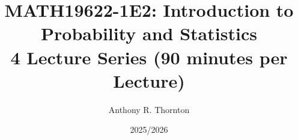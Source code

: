 


\newcommand{\insertcode}[2]{%
  \only<presentation>{%
    \setbeamercolor{block title}{bg=SolarizedAccent, fg=black}
    \setbeamercolor{block body}{bg=SolarizedYellow, fg=black}%
    \begin{block}{#1}
      
    \end{block}%
  }%
  \only<article>{%
    \vspace{0.2cm}
    
    \vspace{0.2cm}
  }%
}

\newcommand{\dd}{\,\mathrm{d}}

\title[MATH19622-1E2]{\textbf{MATH19622-1E2: Introduction to Probability and Statistics}\\
\large 4 Lecture Series (90 minutes per Lecture)}
\author{Anthony R. Thornton}
\date{2025/2026}
